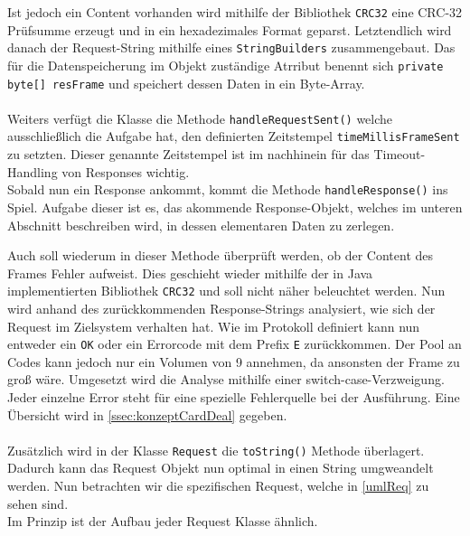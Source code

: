 Ist jedoch ein Content vorhanden wird mithilfe der Bibliothek \lstinline{CRC32} eine CRC-32 Prüfsumme erzeugt und in ein hexadezimales Format geparst.
Letztendlich wird danach der Request-String mithilfe eines \lstinline{StringBuilders} zusammengebaut.
Das für die Datenspeicherung im Objekt zuständige Atrribut benennt sich \lstinline[style=java]{private byte[] resFrame} und speichert dessen Daten in ein Byte-Array.\\\\
Weiters verfügt die Klasse die Methode \lstinline[style=java]{handleRequestSent()} welche ausschließlich die Aufgabe hat, den definierten Zeitstempel \lstinline[style=java]{timeMillisFrameSent} zu setzten.
Dieser genannte Zeitstempel ist im nachhinein für das Timeout-Handling von Responses wichtig.\\
Sobald nun ein Response ankommt, kommt die Methode \lstinline[style=java]{handleResponse()} ins Spiel.
Aufgabe dieser ist es, das akommende Response-Objekt, welches im unteren Abschnitt beschreiben wird, in dessen elementaren Daten zu zerlegen.

Auch soll wiederum in dieser Methode überprüft werden, ob der Content des Frames Fehler aufweist. Dies geschieht wieder mithilfe der in Java implementierten Bibliothek \lstinline{CRC32} und soll nicht näher beleuchtet werden.
Nun wird anhand des zurückkommenden Response-Strings analysiert, wie sich der Request im Zielsystem verhalten hat.
Wie im Protokoll definiert kann nun entweder ein \lstinline[style=java]{OK} oder ein Errorcode mit dem Prefix \lstinline[style=java]{E} zurückkommen.
Der Pool an Codes kann jedoch nur ein Volumen von 9 annehmen, da ansonsten der Frame zu groß wäre.
Umgesetzt wird die Analyse mithilfe einer switch-case-Verzweigung.
%
Jeder einzelne Error steht für eine spezielle Fehlerquelle bei der Ausführung.
Eine Übersicht wird in \autoref{ssec:konzeptCardDeal} gegeben.\\\\
Zusätzlich wird in der Klasse \lstinline[style=java]{Request} die \lstinline[style=java]{toString()} Methode überlagert.
Dadurch kann das Request Objekt nun optimal in einen String umgweandelt werden.
Nun betrachten wir die spezifischen Request, welche in \autoref{umlReq} zu sehen sind.\\
Im Prinzip ist der Aufbau jeder Request Klasse ähnlich.

